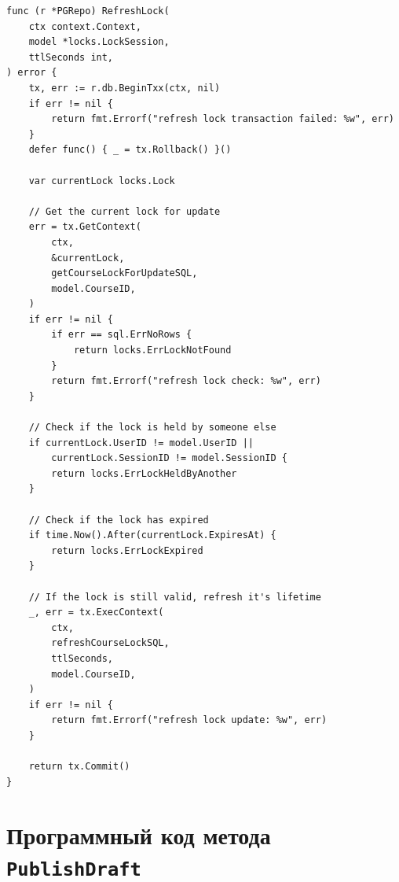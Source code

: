 \documentclass[coursework]{SCWorks}
\begin{document}
\begin{verbatim}
func (r *PGRepo) RefreshLock(
	ctx context.Context,
	model *locks.LockSession,
	ttlSeconds int,
) error {
	tx, err := r.db.BeginTxx(ctx, nil)
	if err != nil {
		return fmt.Errorf("refresh lock transaction failed: %w", err)
	}
	defer func() { _ = tx.Rollback() }()

	var currentLock locks.Lock

	// Get the current lock for update
	err = tx.GetContext(
		ctx,
		&currentLock,
		getCourseLockForUpdateSQL,
		model.CourseID,
	)
	if err != nil {
		if err == sql.ErrNoRows {
			return locks.ErrLockNotFound
		}
		return fmt.Errorf("refresh lock check: %w", err)
	}

	// Check if the lock is held by someone else
	if currentLock.UserID != model.UserID ||
		currentLock.SessionID != model.SessionID {
		return locks.ErrLockHeldByAnother
	}

	// Check if the lock has expired
	if time.Now().After(currentLock.ExpiresAt) {
		return locks.ErrLockExpired
	}

	// If the lock is still valid, refresh it's lifetime
	_, err = tx.ExecContext(
		ctx,
		refreshCourseLockSQL,
		ttlSeconds,
		model.CourseID,
	)
	if err != nil {
		return fmt.Errorf("refresh lock update: %w", err)
	}

	return tx.Commit()
}
\end{verbatim}

\section{Программный код метода \texttt{PublishDraft}}
\end{document}
